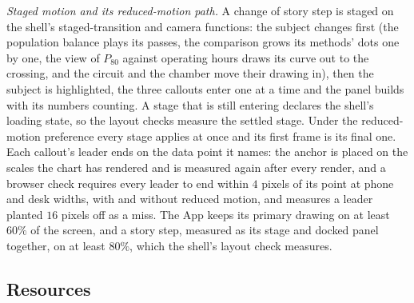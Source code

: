 \emph{Staged motion and its reduced-motion path.} A change of story step is staged on the shell's staged-transition and camera
functions: the subject changes first (the population balance plays its passes, the comparison grows its methods' dots one by one, the
view of $P_{80}$ against operating hours draws its curve out to the crossing, and the circuit and the chamber move their drawing in), then the subject is
highlighted, the three callouts enter one at a time and the panel builds with its numbers counting. A stage that is still entering
declares the shell's loading state, so the layout checks measure the settled stage. Under the reduced-motion preference every stage
applies at once and its first frame is its final one. Each callout's leader ends on the data point it names: the anchor is placed on
the scales the chart has rendered and is measured again after every render, and a browser check requires every leader to end within
$4$ pixels of its point at phone and desk widths, with and without reduced motion, and measures a leader planted $16$ pixels off as
a miss. The App keeps its primary drawing on at least $60\%$ of the screen, and a story step, measured as its stage and docked panel
together, on at least $80\%$, which the shell's layout check measures.

\subsection{Resources}\label{sec:arch-resources}

